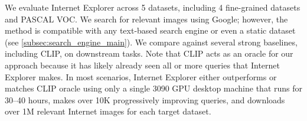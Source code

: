 We evaluate Internet Explorer across 5 datasets, including 4 fine-grained datasets and PASCAL VOC.
We search for relevant images using Google; however, the method is compatible with any text-based search engine or even a static dataset (see \cref{subsec:search_engine_main}).
We compare against several strong baselines, including CLIP, on downstream tasks. Note that CLIP acts as an oracle for our approach because it has likely already seen all or more queries that Internet Explorer makes.
In most scenarios, Internet Explorer either outperforms or matches CLIP oracle using only a single 3090 GPU desktop machine that runs for 30--40 hours, makes over 10K progressively improving queries, and downloads over 1M relevant Internet images for each target dataset.


